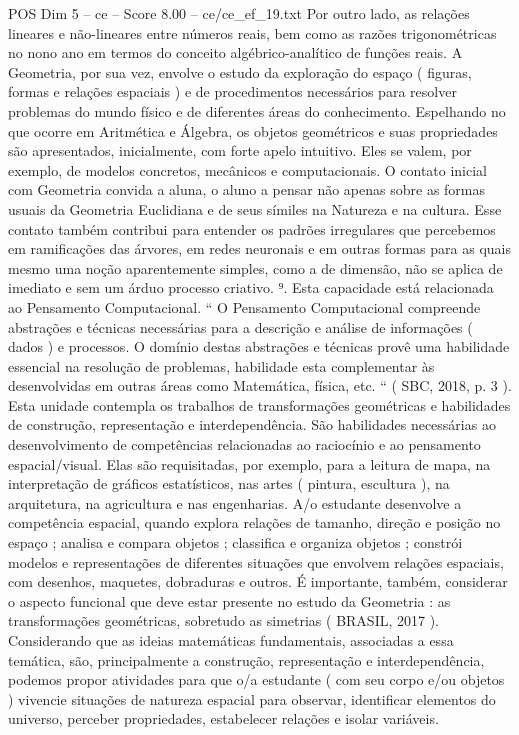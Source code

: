 \begin{textsample}{POS Dim 5 – ce – Score 8.00 – ce/ce\_ef\_19.txt}
Por outro lado, as relações lineares e não-lineares entre números reais, bem como as razões trigonométricas no nono ano em termos do conceito algébrico-analítico de funções reais.
A Geometria, por sua vez, envolve o estudo da exploração do espaço ( figuras, formas e relações espaciais ) e de procedimentos necessários para resolver problemas do mundo físico e de diferentes áreas do conhecimento.
Espelhando no que ocorre em Aritmética e Álgebra, os objetos geométricos e suas propriedades são apresentados, inicialmente, com forte apelo intuitivo.
Eles se valem, por exemplo, de modelos concretos, mecânicos e computacionais.
O contato inicial com Geometria convida a aluna, o aluno a pensar não apenas sobre as formas usuais da Geometria Euclidiana e de seus símiles na Natureza e na cultura.
Esse contato também contribui para entender os padrões irregulares que percebemos em ramificações das árvores, em redes neuronais e em outras formas para as quais mesmo uma noção aparentemente simples, como a de dimensão, não se aplica de imediato e sem um árduo processo criativo. ⁹.
Esta capacidade está relacionada ao Pensamento Computacional. “ O Pensamento Computacional compreende abstrações e técnicas necessárias para a descrição e análise de informações ( dados ) e processos.
O domínio destas abstrações e técnicas provê uma habilidade essencial na resolução de problemas, habilidade esta complementar às desenvolvidas em outras áreas como Matemática, física, etc. “ ( SBC, 2018, p. 3 ).
Esta unidade contempla os trabalhos de transformações geométricas e habilidades de construção, representação e interdependência.
São habilidades necessárias ao desenvolvimento de competências relacionadas ao raciocínio e ao pensamento espacial/visual.
Elas são requisitadas, por exemplo, para a leitura de mapa, na interpretação de gráficos estatísticos, nas artes ( pintura, escultura ), na arquitetura, na agricultura e nas engenharias.
A/o estudante desenvolve a competência espacial, quando explora relações de tamanho, direção e posição no espaço ; analisa e compara objetos ; classifica e organiza objetos ; constrói modelos e representações de diferentes situações que envolvem relações espaciais, com desenhos, maquetes, dobraduras e outros.
É importante, também, considerar o aspecto funcional que deve estar presente no estudo da Geometria : as transformações geométricas, sobretudo as simetrias ( BRASIL, 2017 ).
Considerando que as ideias matemáticas fundamentais, associadas a essa temática, são, principalmente a construção, representação e interdependência, podemos propor atividades para que o/a estudante ( com seu corpo e/ou objetos ) vivencie situações de natureza espacial para observar, identificar elementos do universo, perceber propriedades, estabelecer relações e isolar variáveis.

\end{textsample}
